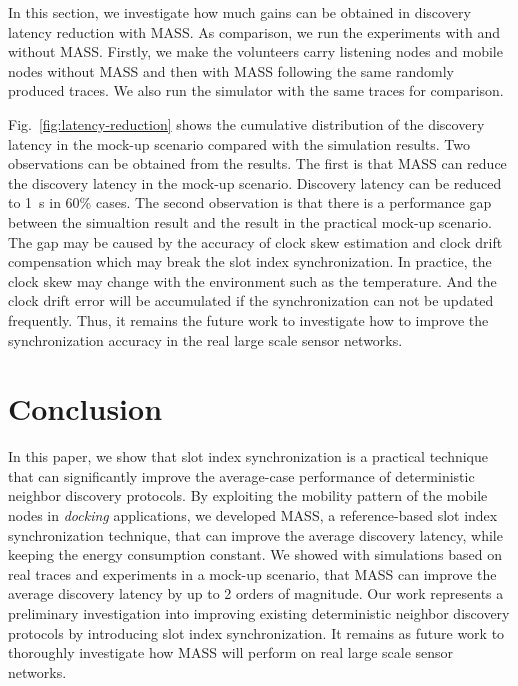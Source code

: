 \documentclass[twoside,twocolumn]{article}
\begin{document}
In this section, we investigate how much gains can be obtained in discovery latency reduction with
MASS. As comparison, we run the experiments with and without MASS. Firstly, we make the volunteers
carry listening nodes and mobile nodes without MASS and then with MASS following the same randomly
produced traces. We also run the simulator with the same traces for comparison.

Fig.~\ref{fig:latency-reduction} shows the cumulative distribution of the discovery latency in the
mock-up scenario compared with the simulation results. Two observations can be obtained from the
results. The first is that MASS can reduce the discovery latency in the mock-up scenario. Discovery
latency can be reduced to 1~s in 60\% cases. The second observation is that there is a performance
gap between the simualtion result and the result in the practical mock-up scenario. The gap may be
caused by the accuracy of clock skew estimation and clock drift compensation which may break the
slot index synchronization. In practice, the clock skew may change with the environment such as the 
temperature. And the clock drift error will be accumulated if the synchronization can not be updated 
frequently. Thus, it remains the future work to investigate how to improve the synchronization accuracy 
in the real large scale sensor networks.

\section{Conclusion}
\label{sec:conclusion}

In this paper, we show that slot index synchronization is a practical
technique that can significantly improve the average-case performance
of deterministic neighbor discovery protocols. By exploiting the
mobility pattern of the mobile nodes in \emph{docking} applications,
we developed MASS, a reference-based slot index synchronization
technique, that can improve the average discovery latency, while
keeping the energy consumption constant.  We showed with simulations
based on real traces and experiments in a mock-up scenario, that MASS 
can improve the average discovery latency by up to 2 orders of magnitude. 
Our work represents a preliminary investigation into improving existing 
deterministic neighbor discovery protocols by introducing slot index
synchronization. It remains as future work to thoroughly investigate
how MASS will perform on real large scale sensor networks.
\end{document}

